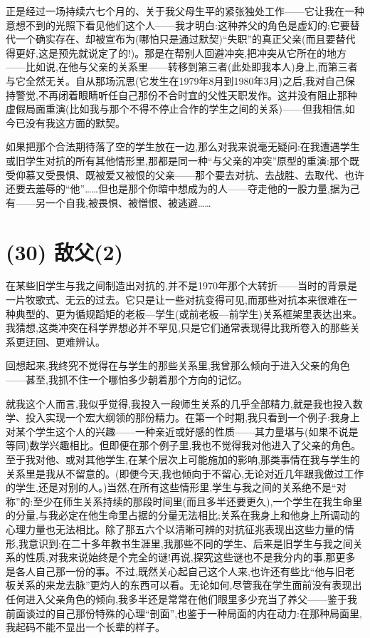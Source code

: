 正是经过一场持续六七个月的、关于我父母生平的紧张独处工作——它让我在一种意想不到的光照下看见他们这个人——我才明白:这种养父的角色是虚幻的;它要替代一个确实存在、却被宣布为(哪怕只是通过默契)“失职”的真正父亲(而且要替代得更好,这是预先就说定了的!)。那是在帮别人回避冲突,把冲突从它所在的地方——比如说,在他与父亲的关系里——转移到第三者(此处即我本人)身上,而第三者与它全然无关。自从那场沉思(它发生在1979年8月到1980年3月)之后,我对自己保持警觉,不再闭着眼睛听任自己那份不合时宜的父性天职发作。这并没有阻止那种虚假局面重演(比如我与那个不得不停止合作的学生之间的关系)——但我相信,如今已没有我这方面的默契。

如果把那个合法期待落了空的学生放在一边,那么对我来说毫无疑问:在我遭遇学生或旧学生对抗的所有其他情形里,那都是同一种“与父亲的冲突”原型的重演:那个既受仰慕又受畏惧、既被爱又被恨的父亲——那个要去对抗、去战胜、去取代、也许还要去羞辱的“他”……但也是那个你暗中想成为的人——夺走他的一股力量,据为己有——另一个自我,被畏惧、被憎恨、被逃避……

\section{(30) 敌父(2)}

在某些旧学生与我之间制造出对抗的,并不是1970年那个大转折——当时的背景是一片牧歌式、无云的过去。它只是让一些对抗变得可见,而那些对抗本来很难在一种典型的、更为循规蹈矩的老板—学生(或前老板—前学生)关系框架里表达出来。我猜想,这类冲突在科学界想必并不罕见,只是它们通常表现得比我所卷入的那些关系更迂回、更难辨认。

回想起来,我终究不觉得在与学生的那些关系里,我曾那么倾向于进入父亲的角色——甚至,我抓不住一个哪怕多少朝着那个方向的记忆。

 就我这个人而言,我似乎觉得,我投入一段师生关系的几乎全部精力,就是我也投入数学、投入实现一个宏大纲领的那份精力。在第一个时期,我只看到一个例子:我身上对某个学生这个人的兴趣——一种亲近或好感的性质——其力量堪与(如果不说是等同)数学兴趣相比。但即便在那个例子里,我也不觉得我对他进入了父亲的角色。至于我对他、或对其他学生,在某个层次上可能施加的影响,那类事情在我与学生的关系里是我从不留意的。(即便今天,我也倾向于不留心,无论对近几年跟我做过工作的学生,还是对别的人。)当然,在所有这些情形里,学生与我之间的关系绝不是“对称”的:至少在师生关系持续的那段时间里(而且多半还要更久),一个学生在我生命里的分量,与我必定在他生命里占据的分量无法相比;关系在我身上和他身上所调动的心理力量也无法相比。除了那五六个以清晰可辨的对抗征兆表现出这些力量的情形,我意识到:在二十多年教书生涯里,我那些不同的学生、后来是旧学生与我之间关系的性质,对我来说始终是个完全的谜!再说,探究这些谜也不是我分内的事,那更多是各人自己那一份的事。不过,既然关心起自己这个人来,也许还有些比“他与旧老板关系的来龙去脉”更灼人的东西可以看。无论如何,尽管我在学生面前没有表现出任何进入父亲角色的倾向,我多半还是常常在他们眼里多少充当了养父——鉴于我前面谈过的自己那份特殊的心理“剖面”,也鉴于一种局面的内在动力:在那种局面里,我起码不能不显出一个长辈的样子。

